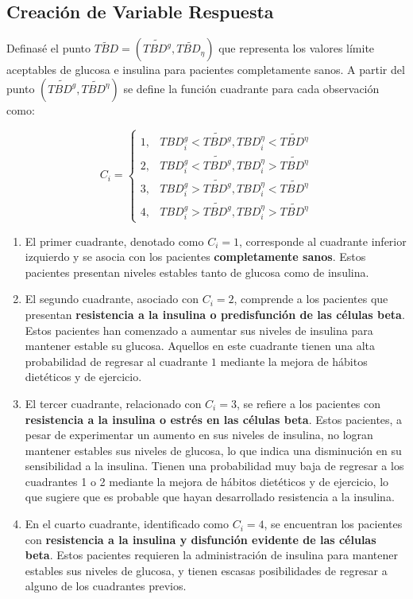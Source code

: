 \subsection{Creación de Variable Respuesta}

Definasé el punto $\widetilde{TBD} = (\widetilde{TBD^g}, \widetilde{TBD_{\eta}})$ que representa los valores límite aceptables de glucosa e insulina para pacientes completamente sanos. A partir del punto $(\widetilde{TBD^g},\widetilde{TBD^{\eta}})$ se define la función cuadrante para cada observación como:

\begin{equation}
     C_ i = \left\{\begin{matrix}
1, & TBD_{i}^{g} < \widetilde{TBD^{g}}, TBD_{i}^{\eta} < \widetilde{TBD^{\eta}}\\
2, & TBD_{i}^{g} < \widetilde{TBD^{g}}, TBD_{i}^{\eta} > \widetilde{TBD^{\eta}}\\
3, & TBD_{i}^{g} > \widetilde{TBD^{g}}, TBD_{i}^{\eta} < \widetilde{TBD^{\eta}}\\
4, & TBD_{i}^{g} > \widetilde{TBD^{g}}, TBD_{i}^{\eta} > \widetilde{TBD^{\eta}}
\end{matrix}\right.
\end{equation}

\begin{enumerate}
    \item El primer cuadrante, denotado como $C_i = 1$, corresponde al cuadrante inferior izquierdo y se asocia con los pacientes \textbf{completamente sanos}. Estos pacientes presentan niveles estables tanto de glucosa como de insulina.
    \item El segundo cuadrante, asociado con $C_i = 2$, comprende a los pacientes que presentan \textbf{resistencia a la insulina o predisfunción de las células beta}. Estos pacientes han comenzado a aumentar sus niveles de insulina para mantener estable su glucosa. Aquellos en este cuadrante tienen una alta probabilidad de regresar al cuadrante $1$ mediante la mejora de hábitos dietéticos y de ejercicio.
    \item El tercer cuadrante, relacionado con $C_i = 3$, se refiere a los pacientes con \textbf{resistencia a la insulina o estrés en las células beta}. Estos pacientes, a pesar de experimentar un aumento en sus niveles de insulina, no logran mantener estables sus niveles de glucosa, lo que indica una disminución en su sensibilidad a la insulina. Tienen una probabilidad muy baja de regresar a los cuadrantes 1 o 2 mediante la mejora de hábitos dietéticos y de ejercicio, lo que sugiere que es probable que hayan desarrollado resistencia a la insulina.
    \item En el cuarto cuadrante, identificado como $C_i = 4$, se encuentran los pacientes con \textbf{resistencia a la insulina y disfunción evidente de las células beta}. Estos pacientes requieren la administración de insulina para mantener estables sus niveles de glucosa, y tienen escasas posibilidades de regresar a alguno de los cuadrantes previos.
\end{enumerate}

